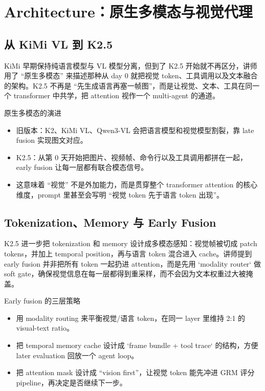 \section{Architecture：原生多模态与视觉代理}

\subsection{从 KiMi VL 到 K2.5}
KiMi 早期保持纯语言模型与 VL 模型分离，但到了 K2.5 开始就不再区分，讲师用了 ``原生多模态'' 来描述那种从 day 0 就把视觉 token、工具调用以及文本融合的架构。K2.5 不再是 ``先生成语言再塞一帧图''，而是让视觉、文本、工具在同一个 transformer 中共学，把 attention 视作一个 multi-agent 的通道。

\begin{importantbox}{原生多模态的演进}
\begin{itemize}
    \item 旧版本：K2、KiMi VL、Qwen3-VL 会把语言模型和视觉模型割裂，靠 late fusion 实现图文对应。
    \item K2.5：从第 0 天开始把图片、视频帧、命令行以及工具调用都拼在一起，early fusion 让每一层都有联合模态信号。
    \item 这意味着 ``视觉'' 不是外加能力，而是贯穿整个 transformer attention 的核心维度，prompt 里甚至会写明 ``视觉 token 先于语言 token 出现''。
\end{itemize}
\end{importantbox}

\subsection{Tokenization、Memory 与 Early Fusion}
K2.5 进一步把 tokenization 和 memory 设计成多模态感知：视觉帧被切成 patch tokens，并加上 temporal position，再与语言 token 混合进入 cache。讲师提到 early fusion 并非把所有 token 一起扔进 attention，而是先用 `modality router` 做 soft gate，确保视觉信息在每一层都得到重采样，而不会因为文本权重过大被掩盖。

\begin{knowledgebox}{Early fusion 的三层策略}
\begin{itemize}
    \item 用 modality routing 来平衡视觉/语言 token，在同一 layer 里维持 2:1 的 visual-text ratio。
    \item 把 temporal memory cache 设计成 `frame bundle + tool trace` 的结构，方便 later evaluation 回放一个 agent loop。
    \item 把 attention mask 设计成 ``vision first''，让视觉 token 能先冲进 GRM 评分 pipeline，再决定是否继续下一步。
\end{itemize}
\end{knowledgebox}

